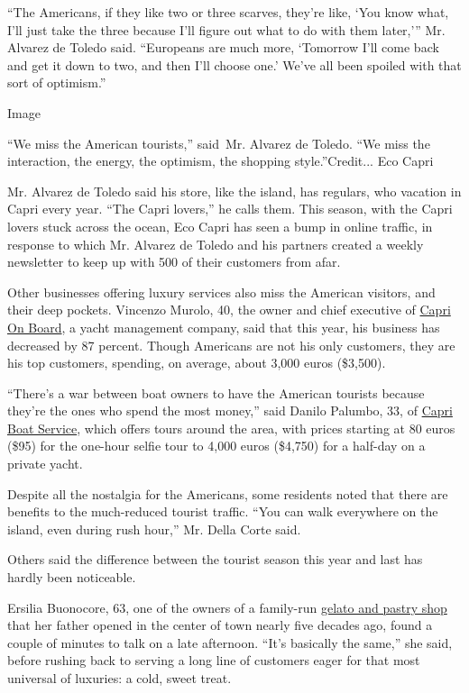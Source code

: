 ``The Americans, if they like two or three scarves, they're like, `You
know what, I'll just take the three because I'll figure out what to do
with them later,''' Mr. Alvarez de Toledo said. ``Europeans are much
more, `Tomorrow I'll come back and get it down to two, and then I'll
choose one.' We've all been spoiled with that sort of optimism.''

Image

``We miss the American tourists,'' said~Mr. Alvarez de Toledo. ``We miss
the interaction, the energy, the optimism, the shopping
style.''Credit... Eco Capri

Mr. Alvarez de Toledo said his store, like the island, has regulars, who
vacation in Capri every year. ``The Capri lovers,'' he calls them. This
season, with the Capri lovers stuck across the ocean, Eco Capri has seen
a bump in online traffic, in response to which Mr. Alvarez de Toledo and
his partners created a weekly newsletter to keep up with 500 of their
customers from afar.

Other businesses offering luxury services also miss the American
visitors, and their deep pockets. Vincenzo Murolo, 40, the owner and
chief executive of \href{https://www.caprionboard.com/}{Capri On Board},
a yacht management company, said that this year, his business has
decreased by 87 percent. Though Americans are not his only customers,
they are his top customers, spending, on average, about 3,000 euros
(\$3,500).

``There's a war between boat owners to have the American tourists
because they're the ones who spend the most money,'' said Danilo
Palumbo, 33, of \href{https://www.capriboatservice.com/}{Capri Boat
Service}, which offers tours around the area, with prices starting at 80
euros (\$95) for the one-hour selfie tour to 4,000 euros (\$4,750) for a
half-day on a private yacht.

Despite all the nostalgia for the Americans, some residents noted that
there are benefits to the much-reduced tourist traffic. ``You can walk
everywhere on the island, even during rush hour,'' Mr. Della Corte said.

Others said the difference between the tourist season this year and last
has hardly been noticeable.

Ersilia Buonocore, 63, one of the owners of a family-run
\href{https://www.facebookcorewwwi.onion/capri.gelateriabuonocore/}{gelato
and pastry shop} that her father opened in the center of town nearly
five decades ago, found a couple of minutes to talk on a late afternoon.
``It's basically the same,'' she said, before rushing back to serving a
long line of customers eager for that most universal of luxuries: a
cold, sweet treat.

